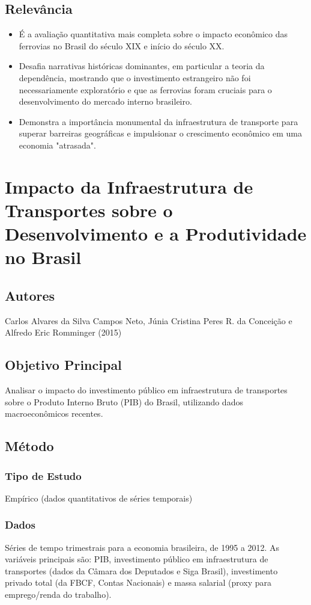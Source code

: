 \documentclass[12pt]{article}
\begin{document}
\subsection*{Relevância}
\begin{itemize}
    \item É a avaliação quantitativa mais completa sobre o impacto econômico das ferrovias no Brasil do século XIX e início do século XX.
    \item Desafia narrativas históricas dominantes, em particular a teoria da dependência, mostrando que o investimento estrangeiro não foi necessariamente exploratório e que as ferrovias foram cruciais para o desenvolvimento do mercado interno brasileiro.
    \item Demonstra a importância monumental da infraestrutura de transporte para superar barreiras geográficas e impulsionar o crescimento econômico em uma economia "atrasada".
\end{itemize}
\newpage

\section{Impacto da Infraestrutura de Transportes sobre o Desenvolvimento e a Produtividade no Brasil}

\subsection*{Autores}
Carlos Alvares da Silva Campos Neto, Júnia Cristina Peres R. da Conceição e Alfredo Eric Romminger (2015)

\subsection*{Objetivo Principal}
Analisar o impacto do investimento público em infraestrutura de transportes sobre o Produto Interno Bruto (PIB) do Brasil, utilizando dados macroeconômicos recentes.

\subsection*{Método}

\subsubsection*{Tipo de Estudo}
Empírico (dados quantitativos de séries temporais)

\subsubsection*{Dados}
Séries de tempo trimestrais para a economia brasileira, de 1995 a 2012. As variáveis principais são: PIB, investimento público em infraestrutura de transportes (dados da Câmara dos Deputados e Siga Brasil), investimento privado total (da FBCF, Contas Nacionais) e massa salarial (proxy para emprego/renda do trabalho).
\end{document}
